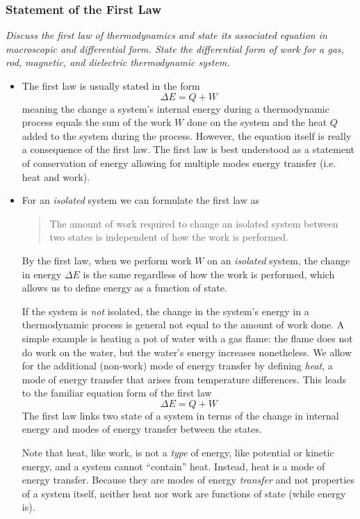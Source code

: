 \documentclass[11pt, a4paper]{article}
\begin{document}
\subsubsection{Statement of the First Law}
\textit{Discuss the first law of thermodynamics and state its associated equation in macroscopic and differential form. State the differential form of work for a gas, rod, magnetic, and dielectric thermodynamic system.}
\begin{itemize}
	\item The first law is usually stated in the form 
	\begin{equation*}
		\Delta E = Q + W 
	\end{equation*}
	meaning the change a system's internal energy during a thermodynamic process equals the sum of the work $ W $ done on the system and the heat $ Q $ added to the system during the process. However, the equation itself is really a consequence of the first law. The first law is best understood as a statement of conservation of energy allowing for multiple modes energy transfer (i.e. heat and work).
	
	\item For an \textit{isolated} system we can formulate the first law as
	\begin{quote}
		The amount of work required to change an isolated system between two states is independent of how the work is performed.
	\end{quote}
	By the first law, when we perform work $ W $ on an \textit{isolated} system, the change in energy $ \Delta E $ is the same regardless of how the work is performed, which allows us to define energy as a function of state.
	
	If the system is \textit{not} isolated, the change in the system's energy in a thermodynamic process is general not equal to the amount of work done. A simple example is heating a pot of water with a gas flame: the flame does not do work on the water, but the water's energy increases nonetheless. We allow for the additional (non-work) mode of energy transfer by defining \textit{heat}, a mode of energy transfer that arises from temperature differences. This leads to the familiar equation form of the first law
	\begin{equation*}
		\Delta E = Q + W
	\end{equation*}
	The first law links two state of a system in terms of the change in internal energy and modes of energy transfer between the states.
	
	Note that heat, like work, is not a \textit{type} of energy, like potential or kinetic energy, and a system cannot ``contain'' heat. Instead, heat is a mode of energy transfer. Because they are modes of energy \textit{transfer} and not properties of a system itself, neither heat nor work are functions of state (while energy is).
	

\end{itemize}
\end{document}
